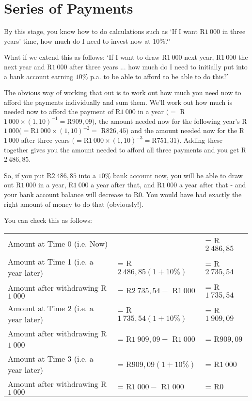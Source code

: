 \section{Series of Payments}

By this stage, you know how to do calculations such as `If I want R$1~000$ in three years' time, how much do I need to invest now at $10\%$?'

What if we extend this as follows: `If I want to draw R$1~000$ next year, R$1~000$ the next year and R$1~000$ after three years ... how much do I need to initially put into a bank account earning $10\%$ p.a. to be able to afford to be able to do this?'

The obvious way of working that out is to work out how much you need now to afford the payments individually and sum them. We'll work out how much is needed now to afford the payment of R$1~000$ in a year $(= $ {R}$1~000\times (1,10)^{-1} = ${R}$909,09)$, the amount needed now for the following year's R$1~000 (= ${R}$1~000\times (1,10)^{-2} = $ {R}$826,45)$ and the amount needed now for the R$1~000$ after three years $(= ${R}$1~000\times (1,10)^{-3} =${R}$751,31)$. Adding these together gives you the amount needed to afford all three payments and you get R$2~486,85$.

So, if you put R$2~486,85$ into a $10\%$ bank account now, you will be able to draw out R$1~000$ in a year, R$1~000$ a year after that, and R$1~000$ a year after that - and your bank account balance will decrease to R$0$. You would have had exactly the right amount of money to do that (obviously!).

You can check this as follows:

\begin{tabular}{lll}
Amount at Time 0 (i.e. Now) &&= R$2~486,85$\\
Amount at Time 1 (i.e. a year later) &= R$2~486,85(1+10\%)$ &= R$2~735,54$\\
Amount after withdrawing R$1~000$ &= R$2~735,54 -$ R$1~000$ &= R$1~735,54$\\
Amount at Time 2 (i.e. a year later) &= R$1~735,54(1+10\%)$ &= R$1~909,09$\\
Amount after withdrawing R$1~00$0 &= R$1~909,09 -$ R$1~000$ &= R$909,09$\\
Amount at Time 3 (i.e. a year later) &= R$909,09(1+10\%)$ &= R$1~000$\\
Amount after withdrawing R$1~000$ &= R$1~000 -$ R$1~000$ &= R$0$\\
\end{tabular}

